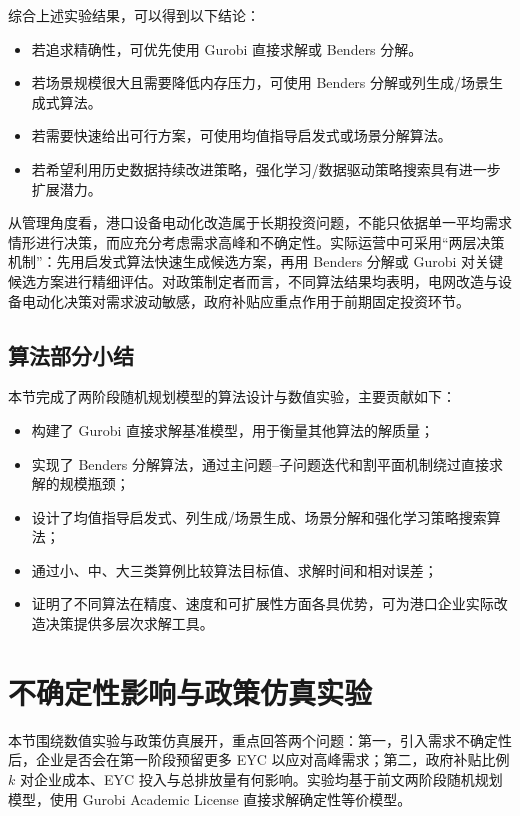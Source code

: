 \documentclass[12pt,a4paper]{article}
\newcommand{\手批注}[2]{\textcolor{#1}{\text{\kaishu #2}}}
\newcommand{\一阶段}{\textcolor{firststage}{\text{\kaishu （一阶段）}}}
\newcommand{\二阶段}{\textcolor{secondstage}{\text{\kaishu （二阶段）}}}
\begin{document}
综合上述实验结果，可以得到以下结论：
\begin{itemize}[itemsep=0.2em,leftmargin=2em]
    \item 若追求精确性，可优先使用 Gurobi 直接求解或 Benders 分解。
    \item 若场景规模很大且需要降低内存压力，可使用 Benders 分解或列生成/场景生成式算法。
    \item 若需要快速给出可行方案，可使用均值指导启发式或场景分解算法。
    \item 若希望利用历史数据持续改进策略，强化学习/数据驱动策略搜索具有进一步扩展潜力。
\end{itemize}

从管理角度看，港口设备电动化改造属于长期投资问题，不能只依据单一平均需求情形进行决策，而应充分考虑需求高峰和不确定性。实际运营中可采用“两层决策机制”：先用启发式算法快速生成候选方案，再用 Benders 分解或 Gurobi 对关键候选方案进行精细评估。对政策制定者而言，不同算法结果均表明，电网改造与设备电动化决策对需求波动敏感，政府补贴应重点作用于前期固定投资环节。

\subsection{算法部分小结}

本节完成了两阶段随机规划模型的算法设计与数值实验，主要贡献如下：
\begin{itemize}[itemsep=0.2em,leftmargin=2em]
    \item 构建了 Gurobi 直接求解基准模型，用于衡量其他算法的解质量；
    \item 实现了 Benders 分解算法，通过主问题--子问题迭代和割平面机制绕过直接求解的规模瓶颈；
    \item 设计了均值指导启发式、列生成/场景生成、场景分解和强化学习策略搜索算法；
    \item 通过小、中、大三类算例比较算法目标值、求解时间和相对误差；
    \item 证明了不同算法在精度、速度和可扩展性方面各具优势，可为港口企业实际改造决策提供多层次求解工具。
\end{itemize}

\newpage
\section{不确定性影响与政策仿真实验}

本节围绕数值实验与政策仿真展开，重点回答两个问题：第一，引入需求不确定性后，企业是否会在第一阶段预留更多 EYC 以应对高峰需求；第二，政府补贴比例 $k$ 对企业成本、EYC 投入与总排放量有何影响。实验均基于前文两阶段随机规划模型，使用 Gurobi Academic License 直接求解确定性等价模型。
\end{document}

